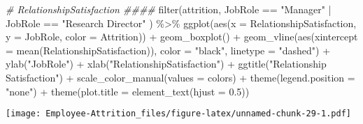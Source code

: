 \documentclass[
]{article}
\newenvironment{Shaded}{\begin{snugshade}}{\end{snugshade}}
\newcommand{\AttributeTok}[1]{\textcolor[rgb]{0.77,0.63,0.00}{#1}}
\newcommand{\CommentTok}[1]{\textcolor[rgb]{0.56,0.35,0.01}{\textit{#1}}}
\newcommand{\FloatTok}[1]{\textcolor[rgb]{0.00,0.00,0.81}{#1}}
\newcommand{\FunctionTok}[1]{\textcolor[rgb]{0.00,0.00,0.00}{#1}}
\newcommand{\NormalTok}[1]{#1}
\newcommand{\SpecialCharTok}[1]{\textcolor[rgb]{0.00,0.00,0.00}{#1}}
\newcommand{\StringTok}[1]{\textcolor[rgb]{0.31,0.60,0.02}{#1}}
\begin{document}
\begin{Shaded}
\begin{Highlighting}[]
\CommentTok{\# RelationshipSatisfaction \#\#\#\#}
\FunctionTok{filter}\NormalTok{(attrition, JobRole }\SpecialCharTok{==} \StringTok{"Manager"} \SpecialCharTok{|}\NormalTok{ JobRole }\SpecialCharTok{==} \StringTok{"Research Director"}\NormalTok{ ) }\SpecialCharTok{\%\textgreater{}\%}
  \FunctionTok{ggplot}\NormalTok{(}\FunctionTok{aes}\NormalTok{(}\AttributeTok{x =}\NormalTok{ RelationshipSatisfaction, }\AttributeTok{y =}\NormalTok{ JobRole, }\AttributeTok{color =}\NormalTok{ Attrition)) }\SpecialCharTok{+}
  \FunctionTok{geom\_boxplot}\NormalTok{() }\SpecialCharTok{+}
  \FunctionTok{geom\_vline}\NormalTok{(}\FunctionTok{aes}\NormalTok{(}\AttributeTok{xintercept =} \FunctionTok{mean}\NormalTok{(RelationshipSatisfaction)), }\AttributeTok{color =} \StringTok{"black"}\NormalTok{, }\AttributeTok{linetype =} \StringTok{"dashed"}\NormalTok{) }\SpecialCharTok{+}
  \FunctionTok{ylab}\NormalTok{(}\StringTok{"JobRole"}\NormalTok{) }\SpecialCharTok{+}
  \FunctionTok{xlab}\NormalTok{(}\StringTok{"RelationshipSatisfaction"}\NormalTok{) }\SpecialCharTok{+}
  \FunctionTok{ggtitle}\NormalTok{(}\StringTok{"Relationship Satisfaction"}\NormalTok{) }\SpecialCharTok{+}
  \FunctionTok{scale\_color\_manual}\NormalTok{(}\AttributeTok{values =}\NormalTok{ colors) }\SpecialCharTok{+}
  \FunctionTok{theme}\NormalTok{(}\AttributeTok{legend.position =} \StringTok{"none"}\NormalTok{) }\SpecialCharTok{+}
  \FunctionTok{theme}\NormalTok{(}\AttributeTok{plot.title =} \FunctionTok{element\_text}\NormalTok{(}\AttributeTok{hjust =} \FloatTok{0.5}\NormalTok{)) }
\end{Highlighting}
\end{Shaded}

\texttt{[image: Employee-Attrition\_files/figure-latex/unnamed-chunk-29-1.pdf]}
\end{document}
